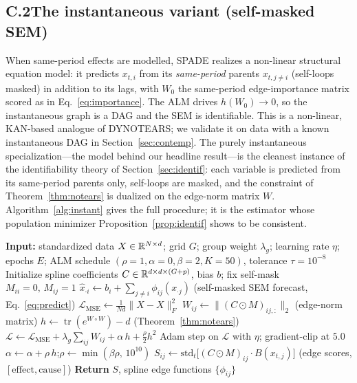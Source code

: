 \subsection*{C.2\quad The instantaneous variant (self-masked SEM)}

When same-period effects are modelled, SPADE realizes a non-linear structural
equation model: it predicts $x_{t,i}$ from its \emph{same-period} parents
$x_{t,j\neq i}$ (self-loops masked) in addition to its lags, with $W_0$ the
same-period edge-importance matrix scored as in Eq.~\eqref{eq:importance}. The ALM
drives $h(W_0)\!\to\!0$, so the instantaneous graph is a DAG and the SEM is
identifiable. This is a non-linear, KAN-based analogue of DYNOTEARS; we validate it
on data with a known instantaneous DAG in Section~\ref{sec:contemp}. The purely
instantaneous specialization---the model behind our headline result---is the
cleanest instance of the identifiability theory of Section~\ref{sec:identif}: each
variable is predicted from its same-period parents only, self-loops are masked, and
the constraint of Theorem~\ref{thm:notears} is dualized on the edge-norm matrix $W$.
Algorithm~\ref{alg:instant} gives the full procedure; it is the estimator whose
population minimizer Proposition~\ref{prop:identif} shows to be consistent.

\begin{algorithm}[t]
\caption{SPADE-Instantaneous: self-masked nonlinear SEM with acyclicity (ALM)}
\label{alg:instant}
\begin{algorithmic}[1]
\STATE \textbf{Input:} standardized data $X\in\mathbb{R}^{N\times d}$; grid $G$; group
weight $\lambda_g$; learning rate $\eta$; epochs $E$; ALM schedule
$(\rho{=}1,\alpha{=}0,\beta{=}2,K{=}50)$, tolerance $\tau{=}10^{-8}$
\STATE Initialize spline coefficients $C\in\mathbb{R}^{d\times d\times(G+p)}$, bias $b$; fix self-mask $M_{ii}{=}0,\,M_{ij}{=}1$
    \STATE $\hat{x}_{\cdot i} \leftarrow b_i + \sum_{j\neq i}\phi_{ij}(x_{\cdot j})$ \quad(self-masked SEM forecast, Eq.~\ref{eq:predict})
    \STATE $\mathcal{L}_{\mathrm{MSE}} \leftarrow \tfrac1{Nd}\lVert \hat X - X\rVert_F^2$
    \STATE $W_{ij} \leftarrow \lVert (C\odot M)_{ij,:}\rVert_2$ \quad(edge-norm matrix)
    \STATE $h \leftarrow \operatorname{tr}(e^{W\circ W})-d$ \hfill(Theorem~\ref{thm:notears})
    \STATE $\mathcal{L} \leftarrow \mathcal{L}_{\mathrm{MSE}} + \lambda_g\!\sum_{ij}W_{ij} + \alpha\,h + \tfrac{\rho}{2}h^2$
    \STATE Adam step on $\mathcal{L}$ with $\eta$; gradient-clip at $5.0$
        \STATE $\alpha \leftarrow \alpha + \rho\,h$;\quad $\rho \leftarrow \min(\beta\rho,\,10^{10})$
    \ENDIF
\ENDFOR
\STATE $S_{ij} \leftarrow \mathrm{std}_t\big[(C\odot M)_{ij}\!\cdot\! B(x_{t,j})\big]$ \quad(edge scores, $[\text{effect},\text{cause}]$)
\STATE \textbf{Return} $S$, spline edge functions $\{\phi_{ij}\}$
\end{algorithmic}
\end{algorithm}


